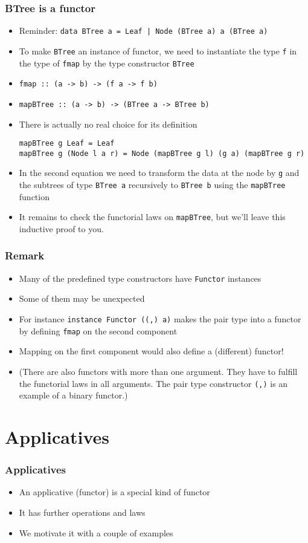 \documentclass{beamer}
\begin{document}
\begin{frame}[fragile]
  \frametitle{BTree is a functor}
  \begin{itemize}[<+->]
  \item Reminder:
    \lstinline/data BTree a = Leaf | Node (BTree a) a (BTree a)/
  \item To make \lstinline/BTree/ an instance of functor, we need to instantiate
    the type \lstinline|f| in the type of \lstinline|fmap| by the type constructor
    \lstinline|BTree|
  \item \lstinline|fmap :: (a -> b) -> (f a -> f b)|
  \item \lstinline|mapBTree :: (a -> b) -> (BTree a -> BTree b)|
  \item There is actually no real choice for its definition
\begin{lstlisting}
mapBTree g Leaf = Leaf
mapBTree g (Node l a r) = Node (mapBTree g l) (g a) (mapBTree g r)
\end{lstlisting}
  \item In the second equation we need to transform the data at the
    node by \lstinline/g/ and the subtrees of type
    \lstinline/BTree a/ recursively to \lstinline/BTree b/ using the
    \lstinline/mapBTree/ function
  \item It remains to check the functorial laws on
    \lstinline|mapBTree|, but we'll leave this inductive proof to you.
  \end{itemize}
\end{frame}
\begin{frame}
  \frametitle{Remark}
  \begin{itemize}
  \item Many of the predefined type constructors have \texttt{Functor}
    instances
  \item Some of them may be unexpected
  \item For instance \lstinline|instance Functor ((,) a)| makes the pair
    type into a functor by defining \texttt{fmap} on the second
    component
  \item Mapping on the first component would also define a (different)
    functor!
  \item (There are also functors with more than one argument. They
    have to fulfill the functorial laws in all arguments. The pair
    type constructor \lstinline|(,)| is an example of a binary functor.)
  \end{itemize}
\end{frame}
\section{Applicatives}
\begin{frame}
  \frametitle{Applicatives}
  \begin{itemize}
  \item An applicative (functor) is a special kind of functor
  \item It has further operations and laws
  \item We motivate it with a couple of examples
  \end{itemize}
\end{frame}
\end{document}
